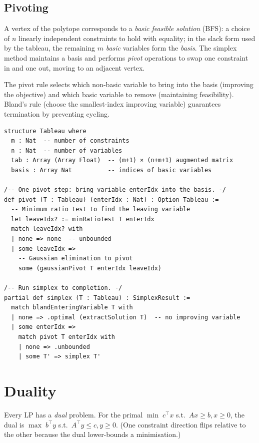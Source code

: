 \documentclass[11pt, a4paper, oneside]{book}
\begin{document}
\subsection{Pivoting}

A vertex of the polytope corresponds to a \emph{basic feasible solution}
(BFS): a choice of $n$ linearly independent constraints to hold with equality;
in the slack form used by the tableau, the remaining $m$ \emph{basic}
variables form the \emph{basis}.
The simplex method maintains a basis and performs \emph{pivot} operations
to swap one constraint in and one out, moving to an adjacent vertex.

The pivot rule selects which non-basic variable to bring into the basis
(improving the objective) and which basic variable to remove (maintaining
feasibility).  Bland's rule (choose the smallest-index improving variable)
guarantees termination by preventing cycling.

\begin{leanbox}[title={Lean 4 --- Simplex Sketch}]
\begin{verbatim}
structure Tableau where
  m : Nat  -- number of constraints
  n : Nat  -- number of variables
  tab : Array (Array Float)  -- (m+1) × (n+m+1) augmented matrix
  basis : Array Nat          -- indices of basic variables

/-- One pivot step: bring variable enterIdx into the basis. -/
def pivot (T : Tableau) (enterIdx : Nat) : Option Tableau :=
  -- Minimum ratio test to find the leaving variable
  let leaveIdx? := minRatioTest T enterIdx
  match leaveIdx? with
  | none => none  -- unbounded
  | some leaveIdx =>
    -- Gaussian elimination to pivot
    some (gaussianPivot T enterIdx leaveIdx)

/-- Run simplex to completion. -/
partial def simplex (T : Tableau) : SimplexResult :=
  match blandEnteringVariable T with
  | none => .optimal (extractSolution T)  -- no improving variable
  | some enterIdx =>
    match pivot T enterIdx with
    | none => .unbounded
    | some T' => simplex T'
\end{verbatim}
\end{leanbox}

\section{Duality}

Every LP has a \emph{dual} problem.  For the primal
$\min\; c^\top x$ s.t.\ $Ax \geq b, x \geq 0$,
the dual is $\max\; b^\top y$ s.t.\ $A^\top y \leq c, y \geq 0$.
(One constraint direction flips relative to the other because the dual
lower-bounds a minimisation.)
\end{document}
